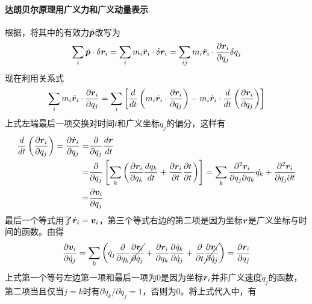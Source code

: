 \paragraph*{达朗贝尔原理用广义力和广义动量表示}
根据，将其中的有效力$\dot{\bm{p}}$改写为
\begin{equation*}
	\begin{aligned}
		\sum_{i} \dot{\bm{p}}\cdot \delta\bm{r}_i = \sum_{i} m_i \ddot{\bm{r}}_i \cdot\delta\bm{r}_i = \sum_{ij} m_i \ddot{\bm{r}}_i \cdot\frac{\partial \bm{r}_i}{\partial q_j}\delta q_j
	\end{aligned}
\end{equation*}
现在利用关系式
\begin{equation}
	\sum_{i} m_i \ddot{\bm{r}}_i\cdot\frac{\partial\bm{r}_i}{\partial q_j}
	=\sum_{i}\left[\frac{d}{dt}\left(m_i\dot{\bm{r}}_i\cdot\frac{\partial\bm{r}_i}{\partial q_j}\right) - m_i\dot{\bm{r}}_i\cdot\frac{d}{dt}\left(\frac{\partial\bm{r}_i}{\partial q_j}\right)\right]
	\label{eq:math-exp}
\end{equation}
上式左端最后一项交换对时间$t$和广义坐标$q_j$的偏分，这样有
\begin{equation}
	\begin{aligned}
	\frac{d}{dt}\left(\frac{\partial\bm{r}_i}{\partial q_j}\right)
	=\frac{\partial\dot{\bm{r}}_i}{\partial q_j}
	=&\frac{\partial}{\partial q_j} \frac{d\bm{r}}{dt} \\
	=&\frac{\partial}{\partial q_j} 
	      \left[\sum_{k}\left(\frac{\partial\bm{r}_i}{\partial q_k}\frac{d q_{k}}{dt} + \frac{\partial \bm{r}_i}{\partial t}\frac{\partial t}{\partial t}\right)\right]
	=\sum_{k}\frac{\partial^2\bm{r}_i}{\partial q_j\partial q_k}\dot{q_k} + \frac{\partial^2 \bm{r}_i}{\partial q_j \partial t}	 \\
	=&\frac{\partial \bm{v}_i}{\partial q_j}
\end{aligned}
\end{equation}
最后一个等式用了$\dot{\bm{r}}_i = \bm{v}_i$，第三个等式右边的第二项是因为坐标$\bm{r}$是广义坐标与时间的函数。由得
\begin{equation}
	\frac{\partial \bm{v}_i}{\partial \dot{q}_j} 
	= \sum_{k}\left(\dot{q}_j\frac{\partial}{\partial q_k}\cancel{\frac{\partial \bm{r}_i}{\partial \dot{q}_j}} + \frac{\partial \bm{r}_i}{\partial q_k}\frac{\partial \dot{q}_k}{\partial \dot{q}_j} + \frac{\partial}{\partial t}\cancel{\frac{\partial \bm{r}_i}{\partial \dot{q}_j}}\right)
	= \frac{\partial \bm{r}_i}{\partial q_j}
\end{equation}
上式第一个等号左边第一项和最后一项为0是因为坐标$\bm{r}_i$并非广义速度$\dot{q}_j$的函数，第二项当且仅当$j = k$时有$\partial \dot{q}_k / \partial \dot{q}_j = 1$，否则为0。将上式代入中，有
